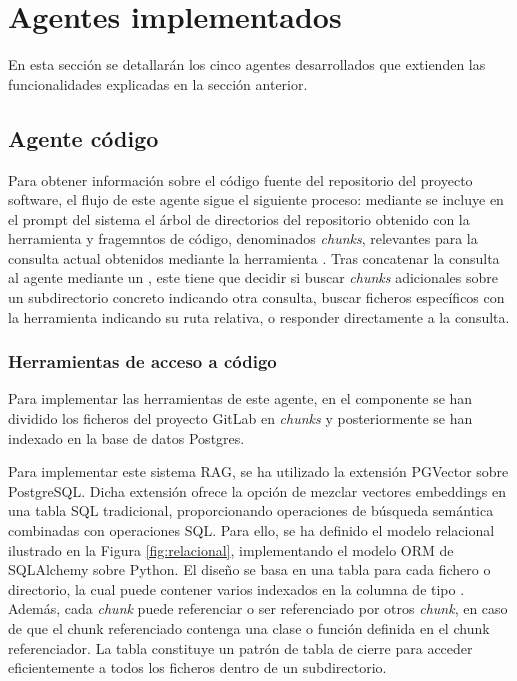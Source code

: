 \section{Agentes implementados}
En esta sección se detallarán los cinco agentes desarrollados que extienden las funcionalidades explicadas en la sección anterior.

\subsection{Agente código}
Para obtener información sobre el código fuente del repositorio del proyecto software, el flujo de este agente sigue el siguiente proceso: mediante  se incluye en el prompt del sistema el árbol de directorios del repositorio obtenido con la herramienta  y fragemntos de código, denominados \textit{chunks}, relevantes para la consulta actual obtenidos mediante la herramienta . Tras concatenar la consulta al agente mediante un , este tiene que decidir si buscar \textit{chunks} adicionales sobre un subdirectorio concreto indicando otra consulta, buscar ficheros específicos con la herramienta  indicando su ruta relativa, o responder directamente a la consulta. 

\subsubsection{Herramientas de acceso a código}
Para implementar las herramientas de este agente, en el componente  se han dividido los ficheros del proyecto GitLab en \textit{chunks} y posteriormente se han indexado en la base de datos Postgres.

Para implementar este sistema RAG, se ha utilizado la extensión PGVector sobre PostgreSQL. Dicha extensión ofrece la opción de mezclar vectores embeddings en una tabla SQL tradicional, proporcionando operaciones de búsqueda semántica combinadas con operaciones SQL. Para ello, se ha definido el modelo relacional ilustrado en la Figura \ref{fig:relacional}, implementando el modelo ORM de SQLAlchemy sobre Python. El diseño se basa en una tabla  para cada fichero o directorio, la cual puede contener varios  indexados en la columna  de tipo . Además, cada \textit{chunk} puede referenciar o ser referenciado por otros \textit{chunk}, en caso de que el chunk referenciado contenga una clase o función definida en el chunk referenciador. La tabla  constituye un patrón de tabla de cierre para acceder eficientemente a todos los ficheros dentro de un subdirectorio. 

